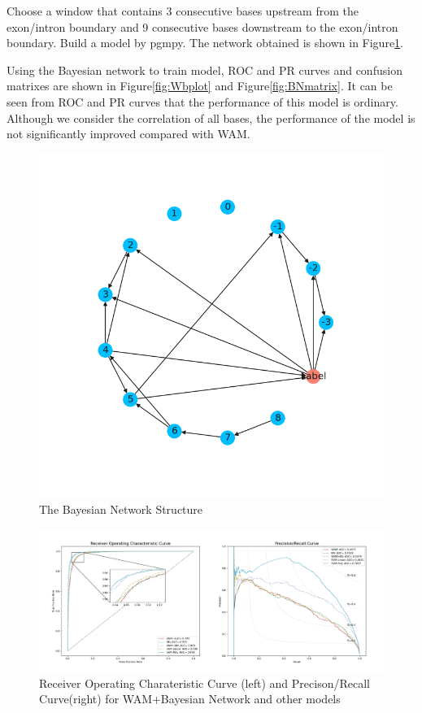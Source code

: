 \documentclass{gapd}
\begin{document}
Choose a window that contains 3 consecutive bases upstream from the
exon/intron boundary and 9 consecutive bases downstream to the
exon/intron boundary. Build a model by pgmpy. The network obtained is
shown in Figure\ref{fig:network}.


Using the Bayesian network to train model, ROC and PR curves and
confusion matrixes are shown in Figure\ref{fig:Wbplot} and Figure\ref{fig:BNmatrix}. It can be seen from ROC
and PR curves that the performance of this model is ordinary. Although
we consider the correlation of all bases, the performance of the model
is not significantly improved compared with WAM.


\begin{figure}
  \centering
  \includegraphics[width=\columnwidth]{assets/network-20210609212835-4n4fayy.png}
  \caption{The Bayesian Network Structure}
  \label{fig:network}
\end{figure}


\begin{figure}
  \centering
  \includegraphics[width=1\linewidth]{assets/image-20210624154804096.png}
  \caption{Receiver Operating Charateristic Curve (left) and Precison/Recall
  Curve(right) for WAM+Bayesian Network and other models}
  \label{fig:WBplot}
\end{figure}
\end{document}
